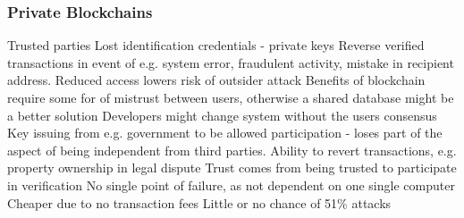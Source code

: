 \subsubsection*{Private Blockchains}

Trusted parties 
Lost identification credentials - private keys
Reverse verified transactions in event of e.g. system error, fraudulent activity, mistake in recipient address. 
Reduced access lowers risk of outsider attack    
Benefits of blockchain require some for of mistrust between users, otherwise a shared database might be a better solution
Developers might change system without the users consensus 
Key issuing from e.g. government to be allowed participation - loses part of the aspect of being independent from third parties. 
Ability to revert transactions, e.g. property ownership in legal dispute 
Trust comes from being trusted to participate in verification
No single point of failure, as not dependent on one single computer
Cheaper due to no transaction fees 
Little or no chance of 51\% attacks
